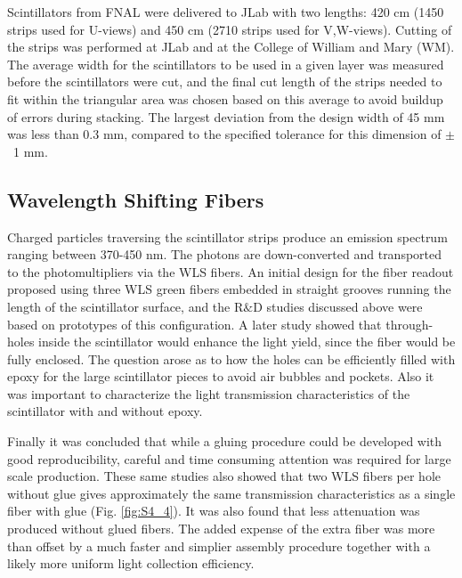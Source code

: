 Scintillators from FNAL were delivered to JLab with two lengths: 420 cm (1450 strips used for U-views) and 450 cm (2710 strips used for V,W-views).   Cutting of the strips was performed at JLab and at the College of William and Mary (WM). The average width for the scintillators to be used in a given layer was measured before the scintillators were cut, and the final cut length of the strips needed to fit within the triangular area was chosen based on this average to avoid buildup of errors during stacking.  The largest deviation from the design width of 45 mm was less than 0.3 mm, compared to the specified  tolerance for this dimension of $\pm$~1 mm.

\subsection{Wavelength Shifting Fibers}
Charged particles traversing the scintillator strips produce an emission spectrum ranging between 370-450 nm. The photons are down-converted and transported to the photomultipliers via the WLS fibers. An initial design for the fiber readout proposed using three WLS green fibers embedded in straight grooves running the length of the scintillator surface, and the R$\&$D studies discussed above \cite{2007007} were based on prototypes of this configuration.  A later study \cite{2009018} showed that through-holes inside the scintillator would enhance the light yield, since the fiber would be fully enclosed. The question arose as to how the holes can be efficiently filled with epoxy for the large scintillator pieces to avoid air bubbles and pockets. Also it was important to characterize the light transmission characteristics of the scintillator with and without epoxy.

Finally it was concluded \cite{2010012} that while a gluing procedure could be developed with good reproducibility, careful and time consuming attention was required for large scale production.  These same studies also showed that two WLS fibers per hole without glue gives approximately the same transmission characteristics as a single fiber with glue (Fig. \ref{fig:S4_4}).  It was also found that less attenuation was produced without glued fibers. The added expense of the extra fiber was more than offset by a much faster and simplier assembly procedure together with a likely more uniform light collection efficiency. 

